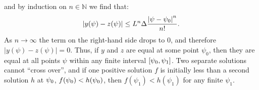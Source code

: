 %
and by induction on $n\in\mathbb{N}$ we find that:
%
\begin{equation}
  \left|y(\psi)-z(\psi)\right| 
  \le
  L^n\Delta\frac{\left|\psi-\psi_0\right|^n}{n!}.
\end{equation}
%
As $n\to\infty$ the term on the right-hand side drops to $0$, and therefore $|y(\psi)-z(\psi)|=0$. Thus, if $y$ and $z$ are equal at some point $\psi_0$, then they are equal at all points $\psi$ within any finite interval $[\psi_0,\psi_1]$. Two separate solutions cannot ``cross over'', and if one positive solution $f$ is initially less than a second solution $h$ at $\psi_0$, $f(\psi_0)<h(\psi_0)$, then $f(\psi_1)<h(\psi_1)$ for any finite $\psi_1$.  

